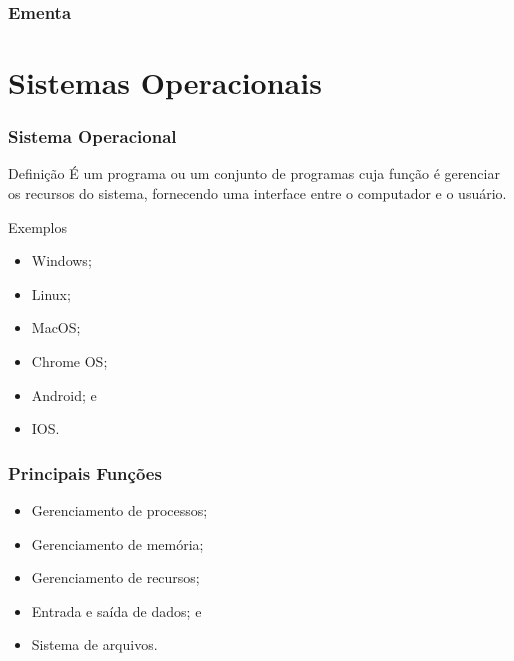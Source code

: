 \documentclass[aspectratio=169]{beamer} %
\begin{document}
\begin{frame}
	\frametitle{Ementa}
  	\tableofcontents
\end{frame}


\section{Sistemas Operacionais}

\begin{frame}
	\frametitle{Sistema Operacional}
	
	\begin{block}{Definição}
		É um programa ou um conjunto de programas cuja função é gerenciar os recursos do sistema, fornecendo uma interface entre o computador e o usuário.	
	\end{block}\vfill
	
	\begin{exampleblock}{Exemplos}
		\begin{itemize}
			\item Windows;
			\item Linux;
			\item MacOS;
			\item Chrome OS; 
			\item Android; e
			\item IOS.
		\end{itemize}
	\end{exampleblock}
\end{frame}

\begin{frame}
	\frametitle{Principais Funções}
	
	\begin{itemize}
		\item Gerenciamento de processos;
		\item Gerenciamento de memória;
		\item Gerenciamento de recursos;
		\item Entrada e saída de dados; e
		\item Sistema de arquivos.
	\end{itemize}
\end{frame}
\end{document}
